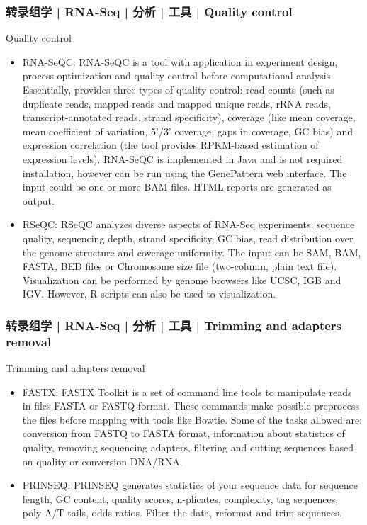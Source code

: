 \begin{frame}
  \frametitle{转录组学 | RNA-Seq | 分析 | 工具 | Quality control}
  {\footnotesize
  \begin{block}{Quality control}
    \begin{itemize}
      \item RNA-SeQC: RNA-SeQC is a tool with application in experiment design, process optimization and quality control before computational analysis. Essentially, provides three types of quality control: read counts (such as duplicate reads, mapped reads and mapped unique reads, rRNA reads, transcript-annotated reads, strand specificity), coverage (like mean coverage, mean coefficient of variation, 5'/3' coverage, gaps in coverage, GC bias) and expression correlation (the tool provides RPKM-based estimation of expression levels). RNA-SeQC is implemented in Java and is not required installation, however can be run using the GenePattern web interface. The input could be one or more BAM files. HTML reports are generated as output.
      \item RSeQC: RSeQC analyzes diverse aspects of RNA-Seq experiments: sequence quality, sequencing depth, strand specificity, GC bias, read distribution over the genome structure and coverage uniformity. The input can be SAM, BAM, FASTA, BED files or Chromosome size file (two-column, plain text file). Visualization can be performed by genome browsers like UCSC, IGB and IGV. However, R scripts can also be used to visualization.
    \end{itemize}
  \end{block}
  }
\end{frame}

\begin{frame}
  \frametitle{转录组学 | RNA-Seq | 分析 | 工具 | Trimming and adapters removal}
  \begin{block}{Trimming and adapters removal}
    \begin{itemize}
      \item FASTX: FASTX Toolkit is a set of command line tools to manipulate reads in files FASTA or FASTQ format. These commands make possible preprocess the files before mapping with tools like Bowtie. Some of the tasks allowed are: conversion from FASTQ to FASTA format, information about statistics of quality, removing sequencing adapters, filtering and cutting sequences based on quality or conversion DNA/RNA.
      \item PRINSEQ: PRINSEQ generates statistics of your sequence data for sequence length, GC content, quality scores, n-plicates, complexity, tag sequences, poly-A/T tails, odds ratios. Filter the data, reformat and trim sequences.
    \end{itemize}
  \end{block}
\end{frame}

